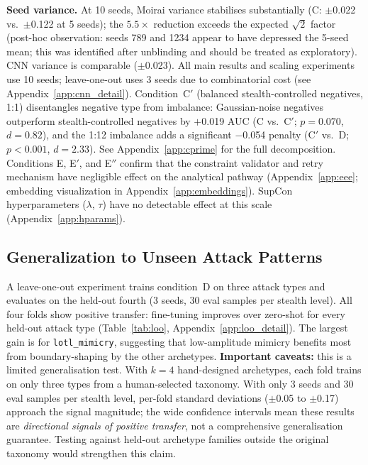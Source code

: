 \textbf{Seed variance.}
At 10 seeds, Moirai variance stabilises substantially (C: $\pm$0.022 vs.\
$\pm$0.122 at 5 seeds); the $5.5\times$ reduction exceeds the expected
$\sqrt{2}$ factor (post-hoc observation: seeds 789 and 1234 appear to have
depressed the 5-seed mean; this was identified after unblinding and should
be treated as exploratory).  CNN variance is comparable ($\pm$0.023).
All main results and scaling experiments use 10 seeds; leave-one-out uses
3 seeds due to combinatorial cost (see Appendix~\ref{app:cnn_detail}).
Condition~C$'$ (balanced stealth-controlled negatives, 1:1) disentangles
negative type from imbalance: Gaussian-noise negatives outperform
stealth-controlled negatives by $+$0.019 AUC
(C vs.\ C$'$; $p{=}0.070$, $d{=}0.82$), and the 1:12 imbalance adds a
significant $-$0.054 penalty (C$'$ vs.\ D; $p{<}0.001$, $d{=}2.33$).
See Appendix~\ref{app:cprime} for the full decomposition.
Conditions E, E$'$, and E$''$ confirm that the constraint validator and
retry mechanism have negligible effect on the analytical pathway
(Appendix~\ref{app:eee}; embedding visualization in Appendix~\ref{app:embeddings}).
SupCon hyperparameters ($\lambda$, $\tau$) have no detectable effect at
this scale (Appendix~\ref{app:hparams}).

\label{sec:experiments:constraints}

\subsection{Generalization to Unseen Attack Patterns}
\label{sec:experiments:loo}

A leave-one-out experiment trains condition~D on three attack types and
evaluates on the held-out fourth (3 seeds, 30 eval samples per stealth level).
All four folds show positive transfer: fine-tuning improves over zero-shot
for every held-out attack type (Table~\ref{tab:loo}, Appendix~\ref{app:loo_detail}).
The largest gain is for \texttt{lotl\_mimicry}, suggesting
that low-amplitude mimicry benefits most from boundary-shaping by
the other archetypes.
\textbf{Important caveats:} this is a limited generalisation test.
With $k{=}4$ hand-designed archetypes, each fold trains on only
three types from a human-selected taxonomy.
With only 3 seeds and 30 eval samples per stealth level, per-fold
standard deviations ($\pm$0.05 to $\pm$0.17) approach the signal
magnitude; the wide confidence intervals mean these results are
\emph{directional signals of positive transfer}, not a comprehensive
generalisation guarantee.
Testing against held-out archetype families outside the original taxonomy
would strengthen this claim.

